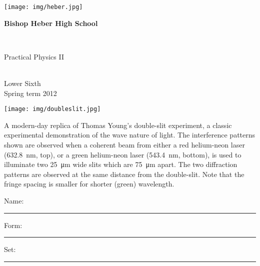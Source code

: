 \documentclass[a4paper,12pt,twoside]{exam}
\begin{document}
\begin{titlepage}

\begin{minipage}{0.2\textwidth}
\texttt{[image: img/heber.jpg]}
\end{minipage}
\hspace{0.05\textwidth}
\begin{minipage}{0.7\textwidth}
\begin{Huge}\textcolor{heberblue}{\textbf{Bishop Heber High School}}\end{Huge}
\end{minipage}\\

\bfseries

\vspace{6em}

\begin{Huge}Practical Physics II\end{Huge}\\
\indent \Large Lower Sixth\\

Spring term 2012\\


\begin{minipage}{0.45\textwidth}
\hfill
\texttt{[image: img/doubleslit.jpg]} 
\hfill	
\end{minipage}
\begin{minipage}{0.45\textwidth}
\footnotesize{{
A modern-day replica of Thomas Young's double-slit experiment, a classic experimental demonstration of the wave nature of light. The interference patterns shown are observed when a coherent beam from either a red helium-neon laser (\SI{632.8}{nm}, top), or a green helium-neon laser (\SI{543.4}{nm}, bottom), is used to illuminate two \SI{25}{\micro\meter} wide slits which are \SI{75}{\micro\meter} apart. The two diffraction patterns are observed at the same distance from the double-slit. Note that the fringe spacing is smaller for shorter (green) wavelength.
}}
\end{minipage}
\begin{flushright}
\end{flushright}

\vfill

\begin{minipage}{0.5\textwidth}
Name:\\
\hrule
\vspace{0.5em} Form: \\
\hrule
\vspace{0.5em} Set: \\
\hrule
\end{minipage}

\thispagestyle{empty}
	
\end{titlepage}
\end{document}
